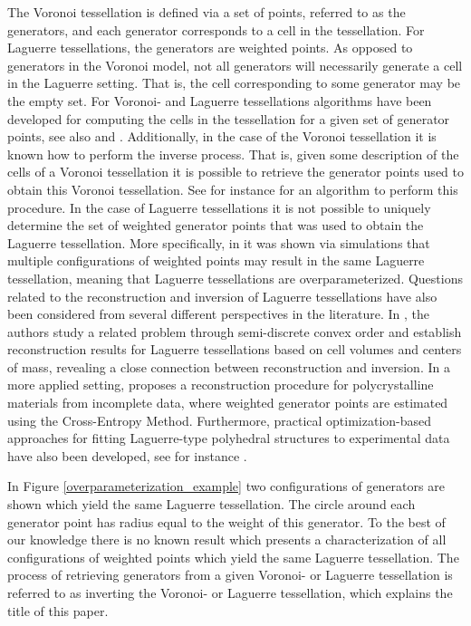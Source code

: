 \documentclass{article}
\theoremstyle{plain}
\theoremstyle{remark}
\theoremstyle{definition}
\begin{document}
The Voronoi tessellation is defined via a set of points, referred to as the generators, and each generator corresponds to a cell in the tessellation. For Laguerre tessellations, the generators are weighted points. As opposed to generators in the Voronoi model, not all generators will necessarily generate a cell in the Laguerre setting. That is, the cell corresponding to some generator may be the empty set. For Voronoi- and Laguerre tessellations algorithms have been developed for computing the cells in the tessellation for a given set of generator points, see also \cite{Okabe2000} and \cite{Aurenhammer1987}. Additionally, in the case of the Voronoi tessellation it is known how to perform the inverse process. That is, given some description of the cells of a Voronoi tessellation it is possible to retrieve the generator points used to obtain this Voronoi tessellation. See for instance \cite{Schoenberg2003} for an algorithm to perform this procedure. In the case of Laguerre tessellations it is not possible to uniquely determine the set of weighted generator points that was used to obtain the Laguerre tessellation. More specifically, in \cite{Duan2014} it was shown via simulations that multiple configurations of weighted points may result in the same Laguerre tessellation, meaning that Laguerre tessellations are overparameterized. Questions related to the reconstruction and inversion of Laguerre tessellations have also been considered from several different perspectives in the literature. In \cite{bourne:hal-05008630,Bourne2025}, the authors study a related problem through semi-discrete convex order and establish reconstruction results for Laguerre tessellations based on cell volumes and centers of mass, revealing a close connection between reconstruction and inversion. In a more applied setting, \cite{Petrich2019} proposes a reconstruction procedure for polycrystalline materials from incomplete data, where weighted generator points are estimated using the Cross-Entropy Method. Furthermore, practical optimization-based approaches for fitting Laguerre-type polyhedral structures to experimental data have also been developed, see for instance \cite{Quey2018}.


In Figure \ref{overparameterization_example} two configurations of generators are shown which yield the same Laguerre tessellation. The circle around each generator point has radius equal to the weight of this generator. To the best of our knowledge there is no known result which presents a characterization of all configurations of weighted points which yield the same Laguerre tessellation. The process of retrieving generators from a given Voronoi- or Laguerre tessellation is referred to as inverting the Voronoi- or Laguerre tessellation, which explains the title of this paper. 
\end{document}
